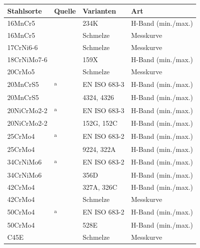 \begin{tabular}{@{}llll@{}}
\toprule
Stahlsorte & Quelle & Varianten & Art \\
\midrule
16MnCr5 & \cite{ovako2026} & 234K & H-Band (min./max.) \\
16MnCr5 & \cite{tomasic2025} & Schmelze & Messkurve \\
17CrNi6-6 & \cite{tomasic2025} & Schmelze & Messkurve \\
18CrNiMo7-6 & \cite{ovako2026} & 159X & H-Band (min./max.) \\
20CrMo5 & \cite{tomasic2025} & Schmelze & Messkurve \\
20MnCrS5 & \cite{ovako2026}\textsuperscript{a} & EN ISO 683-3 & H-Band (min./max.) \\
20MnCrS5 & \cite{ovako2026} & 4324, 4326 & H-Band (min./max.) \\
20NiCrMo2-2 & \cite{ovako2026}\textsuperscript{a} & EN ISO 683-3 & H-Band (min./max.) \\
20NiCrMo2-2 & \cite{ovako2026} & 152G, 152C & H-Band (min./max.) \\
25CrMo4 & \cite{ovako2026}\textsuperscript{a} & EN ISO 683-2 & H-Band (min./max.) \\
25CrMo4 & \cite{ovako2026} & 9224, 322A & H-Band (min./max.) \\
34CrNiMo6 & \cite{ovako2026}\textsuperscript{a} & EN ISO 683-2 & H-Band (min./max.) \\
34CrNiMo6 & \cite{ovako2026} & 356D & H-Band (min./max.) \\
42CrMo4 & \cite{ovako2026} & 327A, 326C & H-Band (min./max.) \\
42CrMo4 & \cite{tomasic2025} & Schmelze & Messkurve \\
50CrMo4 & \cite{ovako2026}\textsuperscript{a} & EN ISO 683-2 & H-Band (min./max.) \\
50CrMo4 & \cite{ovako2026} & 528E & H-Band (min./max.) \\
C45E & \cite{tomasic2025} & Schmelze & Messkurve \\
\bottomrule
\end{tabular}

